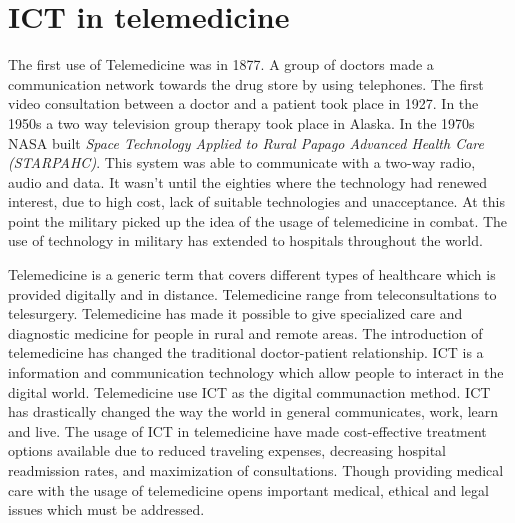 \section{ICT in telemedicine}

The first use of Telemedicine was in 1877. A group of doctors made a communication network towards the drug store by using telephones. The first video consultation between a doctor and a patient took place in 1927. In the 1950s a two way television group therapy took place in Alaska. In the 1970s NASA built \textit{Space Technology Applied to Rural Papago Advanced Health Care (STARPAHC)}. This system was able to communicate with a two-way radio, audio and data. It wasn't until the eighties where the technology had renewed interest, due to high cost, lack of suitable technologies and unacceptance. At this point the military picked up the idea of the usage of telemedicine in combat. The use of technology in military has extended to hospitals throughout the world. 


Telemedicine is a generic term that covers different types of healthcare which is provided digitally and in distance. Telemedicine range from teleconsultations to telesurgery. Telemedicine has made it possible to give specialized care and diagnostic medicine for people in rural and remote areas. The introduction of telemedicine has changed the traditional doctor-patient relationship. 
ICT is a information and communication technology which allow people to interact in the digital world. Telemedicine use ICT as the digital communaction method. ICT has drastically changed the way the world in general communicates, work, learn and live.   
The usage of ICT in telemedicine have made cost-effective treatment options available due to reduced traveling expenses, decreasing hospital readmission rates, and maximization of consultations. Though providing medical care with the usage of telemedicine opens important medical, ethical and legal issues which must be addressed\cite{considerations}.


